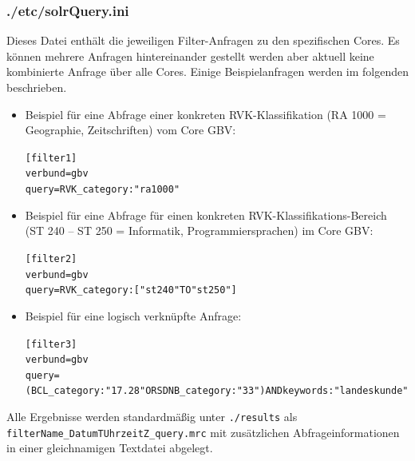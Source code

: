 \documentclass[10pt]{article}
\begin{document}
\subsubsection{./etc/solrQuery.ini}
Dieses Datei enthält die jeweiligen Filter-Anfragen zu den spezifischen Cores. Es können mehrere Anfragen hintereinander gestellt werden aber aktuell keine kombinierte Anfrage über alle Cores. Einige Beispielanfragen werden im folgenden beschrieben.
\begin{itemize}
	\item Beispiel für eine Abfrage einer konkreten RVK-Klassifikation (RA 1000 = Geographie, Zeitschriften) vom Core GBV:
		\begin{alltt}
			[filter1]
			verbund=gbv
			query=RVK_category:"ra 1000"
		\end{alltt}
	\item Beispiel für eine Abfrage für einen konkreten RVK-Klassifikations-Bereich (ST 240 – ST 250 = Informatik, Programmiersprachen) im Core GBV:
		\begin{alltt}
			[filter2]
			verbund=gbv
			query=RVK_category:["st 240" TO "st 250"]
		\end{alltt}
	\item Beispiel für eine logisch verknüpfte Anfrage: 
		\begin{alltt}
			[filter3]
			verbund=gbv
			query=(BCL_category:"17.28" OR SDNB_category:"33") AND 	keywords:"landeskunde"
		\end{alltt}
\end{itemize}
Alle Ergebnisse werden standardmäßig unter \texttt{./results} als \texttt{filterName\_DatumTUhrzeitZ\_query.mrc} mit zusätzlichen Abfrageinformationen in einer gleichnamigen Textdatei abgelegt. 

\newpage
\end{document}
